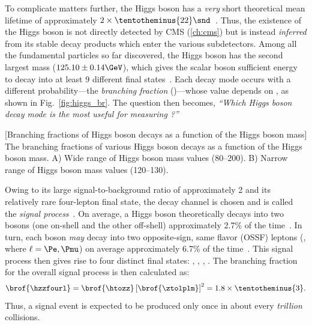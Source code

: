 To complicate matters further, the Higgs boson has a \emph{very} short theoretical mean lifetime of approximately $2 \times \tentotheminus{22}\snd$~\cite{CMS-PAS-HIG-21-013}.
Thus, the existence of the Higgs boson is not directly detected by CMS (\cref{ch:cms}) but is instead \emph{inferred} from its stable decay products which enter the various subdetectors.
Among all the fundamental particles so far discovered, the Higgs boson has the second largest mass ($125.10 \pm 0.14\GeV$), which gives the scalar boson sufficient energy to decay into at least 9 different final states~\cite{particle_data_group_review_2020}.
Each decay mode occurs with a different probability---the \emph{branching fraction} (\br)---whose value depends on \mH, as shown in Fig.~\ref{fig:higgs_br}.
The question then becomes, \emph{``Which Higgs boson decay mode is the most useful for measuring \mH?''}
\begin{multiFigure}
	\centering
		[Branching fractions of Higgs boson decays as a function of the Higgs boson mass]
		{The branching fractions of various Higgs boson decays as a function of the Higgs boson mass.
		\;A) Wide range of Higgs boson mass values (80--200\GeV).
		\;B) Narrow range of Higgs boson mass values (120--130\GeV).}
	\label{fig:higgs_br}
\end{multiFigure} 

Owing to its large signal-to-background ratio of approximately 2 and its relatively rare four-lepton final state, the \hzzfourl decay channel is chosen and is called the \emph{signal process}~\cite{HIG_19_001}.
On average, a Higgs boson theoretically decays into two \PZ bosons (one on-shell and the other off-shell) approximately 2.7\% of the time~\cite{ATLAS:2022vkf}.
In turn, each \PZ boson \emph{may} decay into two opposite-sign, same flavor (OSSF) leptons (\ztolplm, where $\ell = \Pe, \Pmu$) on average approximately 6.7\% of the time~\cite{particle_data_group_review_2020}.
This signal process then gives rise to four distinct final states: \foure, \fourmu, \twoetwomu, \twomutwoe.
The branching fraction for the overall signal process is then calculated as: %
\begin{equation*}
    \brof{\hzzfourl} = \brof{\htozz} \left[ \brof{\ztolplm} \right]^2 = 1.8 \times \tentotheminus{3}.
\end{equation*}
Thus, a signal event is expected to be produced only once in about every \emph{trillion} \pp collisions.

